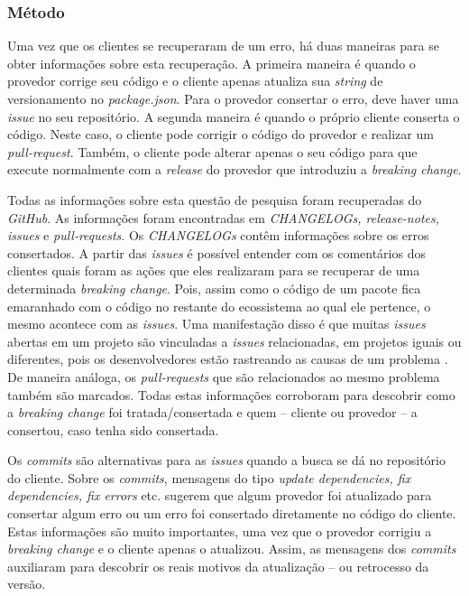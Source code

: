 \subsubsection{Método}
\label{sec:qp3:approach}
Uma vez que os clientes se recuperaram de um erro, há duas maneiras para se obter informações sobre esta recuperação. A primeira maneira é quando o provedor corrige seu código e o cliente apenas atualiza sua \textit{string} de versionamento no \textit{package.json}. Para o provedor consertar o erro, deve haver uma \textit{issue} no seu repositório. A segunda maneira é quando o próprio cliente conserta o código. Neste caso, o cliente pode corrigir o código do provedor e realizar um \textit{pull-request}. Também, o cliente pode alterar apenas o seu código para que execute normalmente com a \textit{release} do provedor que introduziu a \textit{breaking change}.

Todas as informações sobre esta questão de pesquisa foram recuperadas do \textit{GitHub}. As informações foram encontradas em \textit{CHANGELOGs, release-notes, issues} e \textit{pull-requests}. Os \textit{CHANGELOGs} contêm informações sobre os erros consertados. A partir das \textit{issues} é possível entender com os comentários dos clientes quais foram as ações que eles realizaram para se recuperar de uma determinada \textit{breaking change}. Pois, assim como o código de um pacote fica emaranhado com o código no restante do ecossistema ao qual ele pertence, o mesmo acontece com as \textit{issues}. Uma manifestação disso é que muitas \textit{issues} abertas em um projeto são vinculadas a \textit{issues} relacionadas, em projetos iguais ou diferentes, pois os desenvolvedores estão rastreando as causas de um problema \cite{Zhang:2018:WIL:3242887.3242891}. De maneira análoga, os \textit{pull-requests} que são relacionados ao mesmo problema também são marcados. Todas estas informações corroboram para descobrir como a \textit{breaking change} foi tratada/consertada e quem -- cliente ou provedor -- a consertou, caso tenha sido consertada.

Os \textit{commits} são alternativas para as \textit{issues} quando a busca se dá no repositório do cliente. Sobre os \textit{commits}, mensagens do tipo \textit{update dependencies, fix dependencies, fix errors} etc. sugerem que algum provedor foi atualizado para consertar algum erro ou um erro foi consertado diretamente no código do cliente. Estas informações são muito importantes, uma vez que o provedor corrigiu a \textit{breaking change} e o cliente apenas o atualizou. Assim, as mensagens dos \textit{commits} auxiliaram para descobrir os reais motivos da atualização -- ou retrocesso da versão.